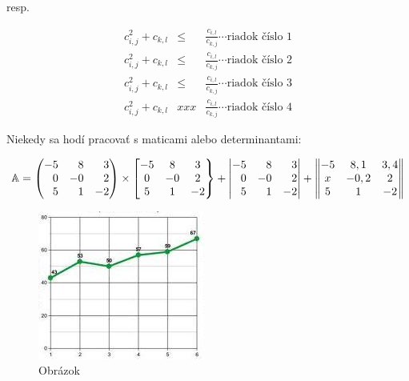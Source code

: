 resp.

\begin{eqnarray}
\label{xx01}
c_{i,j}^2+c_{k,l} &\le& \frac{c_{i,l}}{c_{k,j}} \cdots \mbox{riadok číslo 1} \\
\label{xx02}
c_{i,j}^2+c_{k,l} &\le& \frac{c_{i,l}}{c_{k,j}} \cdots \mbox{riadok číslo 2} \\
\label{xx03}\nonumber
c_{i,j}^2+c_{k,l} &\le& \frac{c_{i,l}}{c_{k,j}} \cdots \mbox{riadok číslo 3} \\
\label{xx04}
c_{i,j}^2+c_{k,l} &xxx& \frac{c_{i,l}}{c_{k,j}} \cdots \mbox{riadok číslo 4}
\end{eqnarray}



\noindent
Niekedy sa hodí pracovať s maticami alebo determinantami:

$$
{\mathbb A} = 
\left( \begin{array}{@{}*{3}{r}@{}}
-5 &  8 &  3\\
 0 & -0 &  2\\
 5 &  1 & -2  
\end{array} \right)
%
\times
%
\left[ \begin{array}{@{}*{3}{c}@{}}
-5 &  8 &  3\\
 0 & -0 &  2\\
 5 &  1 & -2  
\end{array} \right\}
%
+
%
\left| \begin{array}{@{}*{3}{r}@{}}
-5 &  8 &  3\\
 0 & -0 &  2\\
 5 &  1 & -2  
\end{array} \right\vert
%
+
%
\left\Vert\begin{array}{@{}*{3}{c}@{}}
-5 & 8,1  & 3,4 \\
x  & -0,2 & 2   \\
5  & 1    & -2  
\end{array} \right\Vert
$$

\begin{figure}[ht]
\begin{center}
\includegraphics[width=.4\textwidth]{obrazok.jpg}
\caption{Obrázok}
\label{obr2}
\end{center}
\end{figure}

